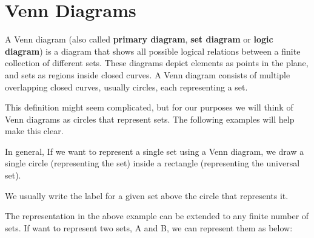 \section{Venn Diagrams}
\begin{definition}
A Venn diagram (also called \textbf{primary diagram}, \textbf{set diagram} or \textbf{logic diagram}) is a diagram that shows all possible logical relations between a finite collection of different sets. These diagrams depict elements as points in the plane, and sets as regions inside closed curves. A Venn diagram consists of multiple overlapping closed curves, usually circles, each representing a set.
\end{definition}

\begin{remark}
This definition might seem complicated, but for our purposes we will think of Venn diagrams as circles that represent sets. The following examples will help make this clear.
\end{remark}

\begin{example}
In general, If we want to represent a single set using a Venn diagram, we draw a single circle (representing the set) inside a rectangle (representing the universal set).

\end{example}


\begin{remark}
We usually write the label for a given set above the circle that represents it.
\end{remark}


\begin{example}
The representation in the above example can be extended to any finite number of sets. If want to represent two sets, A and B, we can represent them as below:


\end{example}




